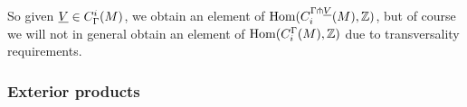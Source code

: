 So given $\underline{V} \in C^i_\Gamma(M)$, we obtain an element of $\textup{Hom}(C_i^{\Gamma\pitchfork \underline{V}}(M),\mathbb{Z})$, but of course we will not in general obtain an element of $\textup{Hom}(C_i^{\Gamma}(M),\mathbb{Z})$ due to transversality requirements.

\begin{comment}
	\begin{proof}
		If $\uV,\uW \in C^*_\Gamma(N)$ are represented by $f \colon V \to N$ and $g \colon W \to N$ that are transverse to $h$, then $\uV+\uW$ is represented by $V \sqcup W$, which will also be transverse to $h$.
		So $C^*_{\Gamma\pf h}(N)$ is closed under addition.
		If $f \colon V \to N$ is transverse to $h$ then so is $-f$, i.e.\ $f$ with the opposite co-orientation, so $C^*_{\Gamma\pf h}(N)$ is closed under taking negatives.
		The empty map $\emptyset \to N$ is always transverse to $h$ (since there are no points at which to check the tangent space condition), and so $0 \in C^*_{\Gamma\pf h}(N)$.
		Finally, if $\uV$ is represented by $f \colon V \to N$ transverse to $h$, then by definition $\bd V \to N$ is transverse to $h$, so $\bd \uV \in C^*_{\Gamma\pf h}(N)$.
		Therefore, $C^*_{\Gamma\pf h}(N)$, is a subcomplex of $C^*_{\Gamma}(N)$.

		To how that $h^*$ is well defined on $C^*_{\Gamma\pf h}(N)$ we must show that it does not depend on the choice of representative $V$.
		Suppose $V$ and $V'$ both represent $\uV$ and are transverse to $h$.
		Then $V \sqcup -V'$ is transverse to $h$ and an element of $Q^*(N)$.
		So by \cref{L: pullback map Q}, $h^*(V \sqcup -V')$, which is by definition $(V \sqcup -V') \times_N M = (V \times_N M) \sqcup (-V' \times_N M)$ mapping to $M$, is an element of $Q^*(M)$.
		So $h^*(V)$ and $h^*(V')$ represent the same element of $C^*_{\Gamma}(M)$.
		Thus $h^*$ is well defined.

		To see that $h^*$ is a homomorphism, let $V,W \to N$ represent elements of $C^*_{\Gamma}(N)$ that are transverse to $h$.
		Then
		$$h^*(\uV+\uW) = \underline{h^*(V \sqcup W)} = \underline{h^*(V) \sqcup h^*(W)} = \underline{h^*(V)}+\underline{h^*(W)},$$
		using the definitions, obvious properties of the pullback and \cref{L: co/chains well defined}.
		Furthermore, $h^*$ is a chain map by \cref{leibniz}, as $\bd M = \emptyset$.
	\end{proof}
\end{comment}

\subsubsection{Exterior products}\label{S: exterior chain products}

